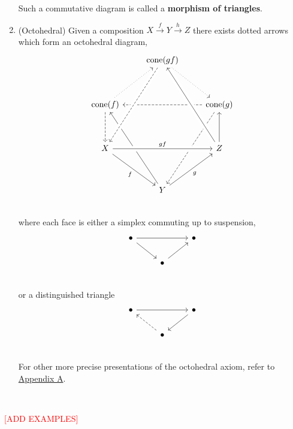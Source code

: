 \documentclass[11pt]{article}
\begin{document}
\begin{defn}
\begin{enumerate}[TC1.]
Such a commutative diagram is called a \textbf{morphism of triangles}.
\item (Octohedral) Given a composition $X \xrightarrow{f} Y \xrightarrow{h} Z$ there exists dotted arrows which form an octohedral diagram,
	\[\begin{tikzcd}
	  & \cone(gf) \ar[ddr,dotted] &  \\
	  &   &  \\
	\cone(f) \ar[from=ddddr] \ar[dd,dashed] \ar[uur,dotted] &   & \cone(g) \ar[ll,dashed] \ar[ddddl,dashed] \\
	  &   &  \\
	 X \ar[ddr,"f"']\ar[from=ruuuu,crossing over, dashed] \ar[crossing over,rr,"gf"] &   & Z \ar[u u] \ar[crossing over, uuuul] \\
	  &   &  \\
	  & Y \ar[ruu,"g"'] &  \\
	\end{tikzcd}\]
	where each face is either a simplex commuting up to suspension,
	\[\begin{tikzcd}
	\bullet  \ar[rd]\ar[rr] &   & \bullet \\
	  & \bullet \ar[ur]  &  \\
	\end{tikzcd}\]
	or a distinguished triangle
	\[\begin{tikzcd}
	\bullet  \ar[from=rd, dashed]\ar[rr] &   & \bullet \\
	  & \bullet \ar[from =ur]  &  \\
	\end{tikzcd}\]
	For other more precise presentations of the octohedral axiom, refer to \hyperlink{octaxiom}{Appendix A}.
\end{enumerate}
\end{defn}

\

\large{\textcolor{red}{[ADD EXAMPLES]}} \normalsize

\
\end{document}
